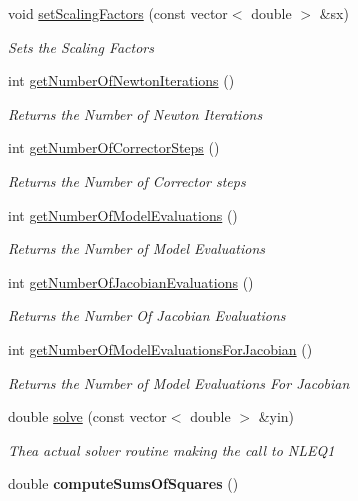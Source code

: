 \begin{DoxyCompactItemize}
\item 
void \hyperlink{classrr_1_1_n_l_e_q_interface_a182947058d6ed7035c185dbd499ee08a}{set\-Scaling\-Factors} (const vector$<$ double $>$ \&sx)
\begin{DoxyCompactList}\small\item\em Sets the Scaling Factors \end{DoxyCompactList}\item 
int \hyperlink{classrr_1_1_n_l_e_q_interface_aee7e693b99b20a84a14d342629053051}{get\-Number\-Of\-Newton\-Iterations} ()
\begin{DoxyCompactList}\small\item\em Returns the Number of Newton Iterations \end{DoxyCompactList}\item 
int \hyperlink{classrr_1_1_n_l_e_q_interface_a5ba8c79471a791dca1b116ec529913bc}{get\-Number\-Of\-Corrector\-Steps} ()
\begin{DoxyCompactList}\small\item\em Returns the Number of Corrector steps \end{DoxyCompactList}\item 
int \hyperlink{classrr_1_1_n_l_e_q_interface_ae3f28f9d17564e83bc7768606f242143}{get\-Number\-Of\-Model\-Evaluations} ()
\begin{DoxyCompactList}\small\item\em Returns the Number of Model Evaluations \end{DoxyCompactList}\item 
int \hyperlink{classrr_1_1_n_l_e_q_interface_a6af8655893eb352e23b6fdff80492b30}{get\-Number\-Of\-Jacobian\-Evaluations} ()
\begin{DoxyCompactList}\small\item\em Returns the Number Of Jacobian Evaluations \end{DoxyCompactList}\item 
int \hyperlink{classrr_1_1_n_l_e_q_interface_a63627b1654fe7d0c5f924e25a8df11eb}{get\-Number\-Of\-Model\-Evaluations\-For\-Jacobian} ()
\begin{DoxyCompactList}\small\item\em Returns the Number of Model Evaluations For Jacobian \end{DoxyCompactList}\item 
double \hyperlink{classrr_1_1_n_l_e_q_interface_ac98c14afc9ab9498d3b69094ae14c6f7}{solve} (const vector$<$ double $>$ \&yin)
\begin{DoxyCompactList}\small\item\em Thea actual solver routine making the call to N\-L\-E\-Q1 \end{DoxyCompactList}\item 
\hypertarget{classrr_1_1_n_l_e_q_interface_a727e5bacd2968ce5c36ef486c2c29cdc}{double {\bfseries compute\-Sums\-Of\-Squares} ()}\label{classrr_1_1_n_l_e_q_interface_a727e5bacd2968ce5c36ef486c2c29cdc}


\end{DoxyCompactItemize}
